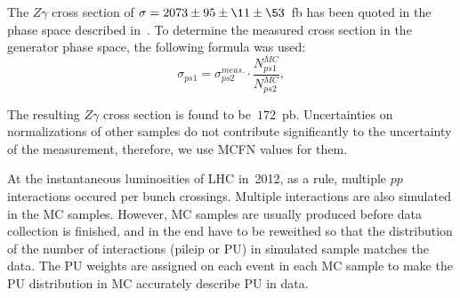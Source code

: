 The $Z\gamma$ cross section of $\sigma = 2073 \pm 95 \pm \11 \pm \53$~fb has been quoted in the phase space described in~\cite{Zg8TeV}. To determine the measured cross section in the generator phase space, the following formula was used:
\begin{equation}
\sigma_{ps1} = \sigma_{ps2}^{meas.} \cdot \frac{N_{ps1}^{MC}}{N_{ps2}^{MC}},
\end{equation}

The resulting $Z\gamma$ cross section is found to be~$172$~pb. Uncertainties on normalizations of other samples do not contribute significantly to the uncertainty of the measurement, therefore, we use MCFN values for them.


At the instantaneous luminosities of LHC in~2012, as a rule, multiple $pp$ interactions occured per bunch crossings. Multiple interactions are also simulated in the MC samples. However, MC samples are usually produced before data collection is finished, and in the end have to be reweithed so that the distribution of the number of interactions (pileip or PU) in simulated sample matches the data. The PU weights are assigned on each event in each MC sample to make the PU distribution in MC accurately describe PU in data.

